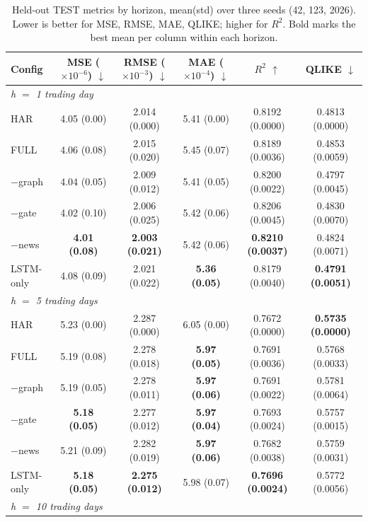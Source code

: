 \documentclass[runningheads]{llncs}
\begin{document}
\begin{table}[t]
\caption{Held-out TEST metrics by horizon, mean(std) over three seeds (42, 123, 2026). Lower is better for
MSE, RMSE, MAE, QLIKE; higher for $R^2$. Bold marks the best mean per column within each horizon.}
\label{tab:metrics}
\centering
\begin{tabular}{lccccc}
\toprule
Config & MSE ($\times10^{-6}$) $\downarrow$ & RMSE ($\times10^{-3}$) $\downarrow$
 & MAE ($\times10^{-4}$) $\downarrow$ & $R^2$ $\uparrow$ & QLIKE $\downarrow$ \\
\midrule
\multicolumn{6}{l}{\emph{h $=$ 1 trading day}} \\
HAR         & 4.05 (0.00) & 2.014 (0.000) & 5.41 (0.00) & 0.8192 (0.0000) & 0.4813 (0.0000) \\
FULL        & 4.06 (0.08) & 2.015 (0.020) & 5.45 (0.07) & 0.8189 (0.0036) & 0.4853 (0.0059) \\
$-$graph    & 4.04 (0.05) & 2.009 (0.012) & 5.41 (0.05) & 0.8200 (0.0022) & 0.4797 (0.0045) \\
$-$gate     & 4.02 (0.10) & 2.006 (0.025) & 5.42 (0.06) & 0.8206 (0.0045) & 0.4830 (0.0070) \\
$-$news     & \textbf{4.01 (0.08)} & \textbf{2.003 (0.021)} & 5.42 (0.06) & \textbf{0.8210 (0.0037)} & 0.4824 (0.0071) \\
LSTM-only   & 4.08 (0.09) & 2.021 (0.022) & \textbf{5.36 (0.05)} & 0.8179 (0.0040) & \textbf{0.4791 (0.0051)} \\
\midrule
\multicolumn{6}{l}{\emph{h $=$ 5 trading days}} \\
HAR         & 5.23 (0.00) & 2.287 (0.000) & 6.05 (0.00) & 0.7672 (0.0000) & \textbf{0.5735 (0.0000)} \\
FULL        & 5.19 (0.08) & 2.278 (0.018) & \textbf{5.97 (0.05)} & 0.7691 (0.0036) & 0.5768 (0.0033) \\
$-$graph    & 5.19 (0.05) & 2.278 (0.011) & \textbf{5.97 (0.06)} & 0.7691 (0.0022) & 0.5781 (0.0064) \\
$-$gate     & \textbf{5.18 (0.05)} & 2.277 (0.012) & \textbf{5.97 (0.04)} & 0.7693 (0.0024) & 0.5757 (0.0015) \\
$-$news     & 5.21 (0.09) & 2.282 (0.019) & \textbf{5.97 (0.06)} & 0.7682 (0.0038) & 0.5759 (0.0031) \\
LSTM-only   & \textbf{5.18 (0.05)} & \textbf{2.275 (0.012)} & 5.98 (0.07) & \textbf{0.7696 (0.0024)} & 0.5772 (0.0056) \\
\midrule
\multicolumn{6}{l}{\emph{h $=$ 10 trading days}} \\

\end{tabular}
\end{table}
\end{document}
